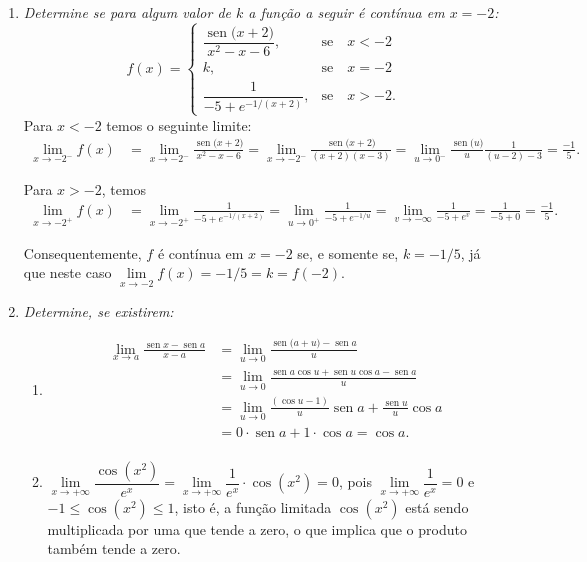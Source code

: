 \documentclass[12pt,a4paper]{article}
\newcommand*\sen[1]{\operatorname{sen}{#1}}
\begin{document}
\begin{enumerate}
\item \textit{ Determine se para algum valor de $k$ a função a seguir é contínua em $x = -2$:}
\[f(x)=\left\{\begin{array}{ll}
\dfrac{\sen(x+2)}{x^2-x-6}, & \text{se}\quad x<-2\\
k, & \text{se}\quad x = -2 \\
\dfrac{1}{-5 + e^{-1/(x + 2)}}, & \text{se}\quad x > -2.
\end{array}\right.
\]
Para $x<-2$ temos o seguinte limite:
\begin{align*}
\lim\limits_{x\to -2^-} f(x)
& = \lim\limits_{x\to -2^-} \frac{\sen(x+2)}{x^2-x-6}
  = \lim\limits_{x\to -2^-} \frac{\sen(x+2)}{(x+2)(x-3)}
  = \lim\limits_{u\to 0^-} \frac{\sen(u)}{u}\frac{1}{(u-2)-3}
  = \frac{-1}{5}.
\end{align*}

Para $x>-2$, temos
\begin{align*}
\lim\limits_{x\to -2^+} f(x)
& = \lim\limits_{x\to -2^+} \frac{1}{-5 + e^{-1/(x + 2)}}
  = \lim\limits_{u\to 0^+} \frac{1}{-5 + e^{-1/u}}
  = \lim\limits_{v\to -\infty} \frac{1}{-5 + e^v}
  = \frac{1}{-5 + 0}
  = \frac{-1}{5}.
\end{align*}

Consequentemente, $f$ é contínua em $x=-2$ se, e somente se, $k = -1/5$, já que neste caso $\lim\limits_{x\to -2} f(x) = -1/5 = k = f(-2)$.

\item \textit{ Determine, se existirem:}
\begin{enumerate}
\item
\begin{align*}
\lim\limits_{x\to a} \frac{\sen x-\sen a}{x-a}
& = \lim\limits_{u \to 0} \frac{\sen(a+u)-\sen a}{u}\\
& = \lim\limits_{u \to 0} \frac{\sen a \cos u +\sen u\cos a-\sen a}{u}\\
& = \lim\limits_{u \to 0} \frac{(\cos u - 1)}{u}\sen a + \frac{\sen u}{u}\cos a\\
& = 0 \cdot \sen a + 1 \cdot \cos a
  = \cos a.\\
\end{align*}

\item $\lim\limits_{x\to +\infty} \dfrac{\cos(x^2)}{e^x} = \lim\limits_{x\to +\infty} \dfrac{1}{e^x} \cdot \cos(x^2) = 0$, pois $\lim\limits_{x\to +\infty} \dfrac{1}{e^x} = 0$ e $-1 \leq \cos(x^2) \leq 1$, isto é, a função limitada $\cos(x^2)$ está sendo multiplicada por uma que tende a zero, o que implica que o produto também tende a zero.


\end{enumerate}
\end{enumerate}
\end{document}
